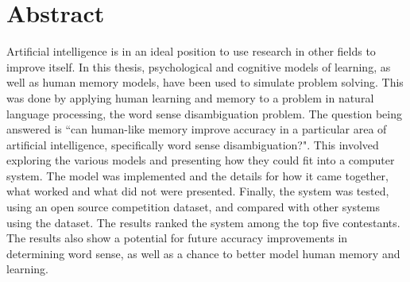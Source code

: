 \doublespacing 
\chapter*{Abstract}

Artificial intelligence is in an ideal position to use research in other fields
to improve itself.  In this thesis, psychological and cognitive
models of learning, as well as human memory models, have been used to simulate problem
solving.  This was done by applying human learning and memory to a problem in
natural language processing, the word sense disambiguation problem. The question being 
answered is ``can human-like memory improve accuracy in a particular area of artificial
intelligence, specifically word sense disambiguation?". This involved exploring the 
various models and presenting how they could fit into a computer system.  The model was
implemented and the details for how it came together, what worked and what did not were
presented.  Finally, the system was tested, using an open source competition dataset, 
and compared with other systems using the dataset.  The results ranked the system among
the top five contestants. The results also show a potential for future accuracy 
improvements in determining word sense, as well as a chance to better model human memory 
and learning.
